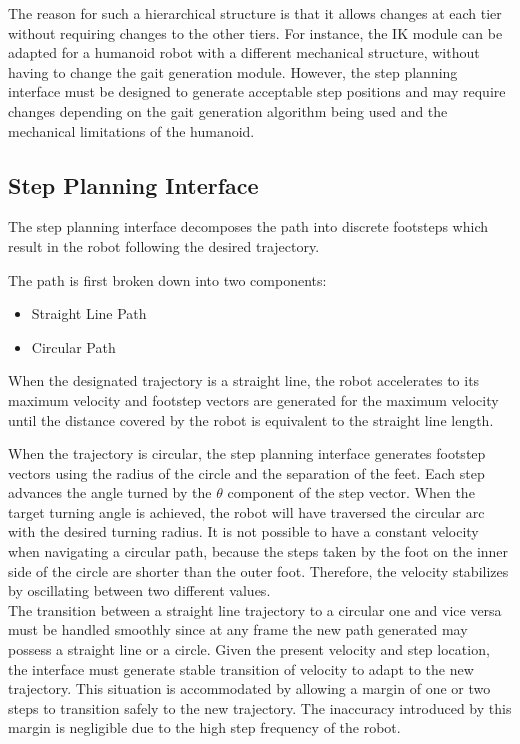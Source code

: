 \documentclass[letterpaper, 10 pt, conference]{ieeeconf}  %
\begin{document}
The reason for such a hierarchical structure is that it allows changes at each
tier without requiring changes to the other tiers. For instance,
the IK module can be adapted for a humanoid robot with a
different mechanical structure, without having to change the gait generation
module. However, the step planning interface must be designed to generate acceptable step positions and may require changes depending on the gait generation algorithm being used and the mechanical limitations of the humanoid.

\subsection{Step Planning Interface}
The step planning interface decomposes the path into discrete footsteps which result in the robot following the desired trajectory.

The path is first broken down into two components:
\begin{itemize}
  \item Straight Line Path
  \item Circular Path
\end{itemize}

When the designated trajectory is a straight line, the robot accelerates to its maximum velocity and footstep vectors are generated for the maximum velocity until the distance covered by the robot is equivalent to the straight line length. 
 
When the trajectory is circular, the step planning interface generates footstep vectors using the radius of the circle and the separation of the feet. Each step advances the angle turned by the $\theta$ component of the step vector. When the target turning angle is achieved, the robot will have traversed the circular arc with the desired turning radius. It is not possible to have a constant velocity when navigating a circular path, because the steps taken by the foot on the inner side of the circle are shorter than the outer foot. Therefore, the velocity stabilizes by oscillating between two different values. \\ 
The transition between a straight line trajectory to a circular one and vice versa must be handled smoothly since at any frame the new path generated may possess a straight line or a circle. Given the present velocity and step location, the interface must generate stable transition of velocity to adapt to the new trajectory. This situation is accommodated by allowing a margin of one or two steps to transition safely to the new trajectory. The inaccuracy introduced by this margin is negligible due to the high step frequency of the robot.
\end{document}

